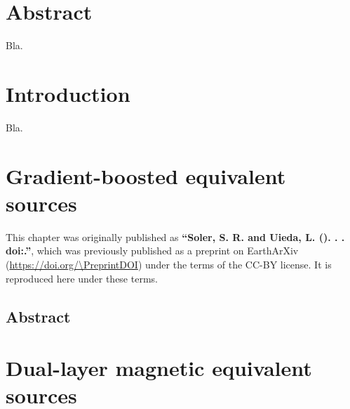 \documentclass[10pt,a4paper,oneside]{book}
\begin{document}
\chapter*{Abstract}

Bla.

\tableofcontents

\mainmatter
\pagestyle{fancy}

\chapter{Introduction}

Bla.

\chapter{Gradient-boosted equivalent sources}

\begingroup


\begin{summarybox}
    \noindent
    This chapter was originally published as
    \textbf{``Soler, S. R. and Uieda, L. (\Year). \Title{}. \textit{\Journal{}}.
    doi:\href{https://doi.org/\DOI}{\DOI}.''}, which was previously published
    as a preprint on EarthArXiv (\url{https://doi.org/\PreprintDOI}) under the
    terms of the CC-BY license. It is reproduced here under these terms.
\end{summarybox}

\section*{Abstract}


% 
\endgroup

\chapter{Dual-layer magnetic equivalent sources}

\end{document}
